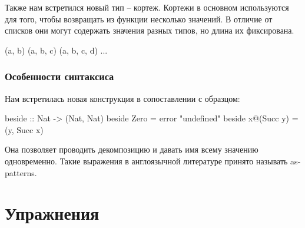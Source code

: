 Также нам встретился новый тип -- кортеж. Кортежи в основном
используются для того, чтобы возвращать из функции 
несколько значений. В отличие от списков они могут 
содержать значения разных типов, но длина их фиксирована.

\begin{code}
(a, b)
(a, b, c)
(a, b, c, d)
...
\end{code}


\subsubsection{Особенности синтаксиса}

Нам встретилась новая конструкция в сопоставлении с образцом:

\begin{code}
beside :: Nat -> (Nat, Nat)
beside  Zero       = error "undefined"
beside  x@(Succ y) = (y, Succ x)
\end{code}

Она позволяет проводить декомпозицию и давать имя 
всему значению одновременно. Такие выражения 
в англоязычной литературе принято называть as-patterns.

\section{Упражнения}

